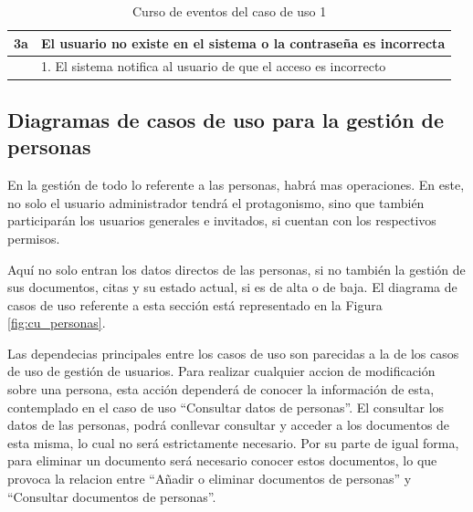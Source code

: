 \begin{table}[hp!]
{\begin{tabular}{|l|l|l|l|}
        \hline
        3a & \multicolumn{3}{l|}{ El usuario no existe en el sistema o la contraseña es incorrecta }                                                                                                                                          \\ 
        \hline
        & \multicolumn{3}{l|}{1. El sistema notifica al usuario de que el acceso es incorrecto}                                                                                                                                            \\
        \hline
        \end{tabular}
    }
    \caption{Curso de eventos del caso de uso 1}
\end{table}

\newpage

\subsection{Diagramas de casos de uso para la gestión de personas}

En la gestión de todo lo referente a las personas, habrá mas operaciones. En este, no solo el usuario administrador tendrá el protagonismo, sino que también participarán los usuarios generales e invitados, si cuentan con los respectivos permisos.

Aquí no solo entran los datos directos de las personas, si no también la gestión de sus documentos, citas y su estado actual, si es de alta o de baja. El diagrama de casos de uso referente a esta sección está representado en la Figura \ref{fig:cu_personas}. 

Las dependecias principales entre los casos de uso son parecidas a la de los casos de uso de gestión de usuarios. Para realizar cualquier accion de modificación sobre una persona, esta acción dependerá de conocer la información de esta, contemplado en el caso de uso ``Consultar datos de personas''. El consultar los datos de las personas, podrá conllevar consultar y acceder a los documentos de esta misma, lo cual no será estrictamente necesario. Por su parte de igual forma, para eliminar un documento será necesario conocer estos documentos, lo que provoca la relacion entre ``Añadir o eliminar documentos de personas'' y ``Consultar documentos de personas''. 

